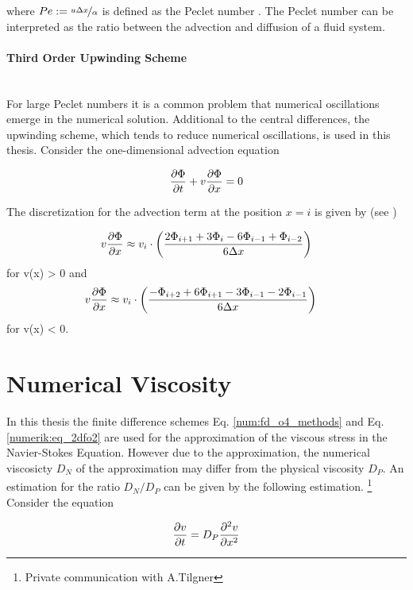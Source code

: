 where $ Pe := \nicefrac{u \Delta x}{\alpha}$ is defined as the Peclet number \citep{ferziger99}.
The Peclet number can be interpreted as the ratio between the advection and diffusion of a fluid system.

\paragraph{Third Order Upwinding Scheme}\mbox{}\\

For large Peclet numbers it is a common problem that numerical oscillations emerge in the numerical solution.
Additional to the central differences, the upwinding scheme, which tends to reduce
numerical oscillations, is used in this thesis. Consider the one-dimensional advection equation

\begin{align}
    \pdn[\Phi]{t} + v\pdn[\Phi]{x} = 0
\end{align}

The discretization for the advection term at the position $x=i$ is given by (see \citep{FINDQUOTE})

\begin{align}
    v\pdn[\Phi]{x} &\approx  v_i \cdot \left(\frac{2\Phi_{i+1} + 3\Phi_i     - 6\Phi_{i-1} + \Phi_{i-2}}{6\Delta x}\right)\\
\end{align}
for v(x) > 0 and
\begin{align}
    v\pdn[\Phi]{x} &\approx  v_i \cdot \left( \frac{-\Phi_{i+2} + 6\Phi_{i+1} - 3\Phi_{i-1} - 2\Phi_{i-1}}{6\Delta x}\right)
\end{align}
for v(x) < 0.

\newpage

\section{Numerical Viscosity}

In this thesis the finite difference schemes Eq.  \ref{num:fd_o4_methods} and Eq.  \ref{numerik:eq_2dfo2}
are used for the approximation of the viscous stress in the Navier-Stokes Equation.
However due to the approximation, the numerical viscosicty $D_N$ of the approximation may differ from the physical viscosity $D_P$.
An estimation for the ratio $D_N/D_P$ can be given by the following estimation. \footnote{Private communication with A.Tilgner}
Consider the  equation

\begin{align}
    \label{num:nvis_eqdiff}
    \pdn[v]{t} = D_P\pdn[^2v]{x^2}
\end{align}

